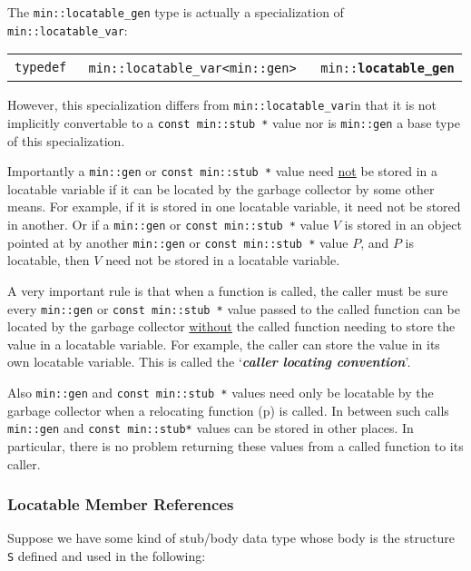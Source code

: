\documentclass[12pt]{article}
\makeatletter
\newcommand{\key}[1]{{\bf \em #1}\index{#1}}
\newcommand{\ttindex}[1]{\index{#1@{\tt #1}}}
\newcommand{\minindex}[1]{\ttindex{min::#1}\ttindex{#1}}
\newcommand{\pagref}[1]{p\pageref{#1}}
\newcommand{\EOL}{\penalty \exhyphenpenalty}
\newenvironment{indpar}[1][0.3in]%
	{\begin{list}{}%
		     {\setlength{\itemsep}{0in}%
		      \setlength{\topsep}{0in}%
		      \setlength{\parsep}{1ex}%
		      \setlength{\labelwidth}{#1}%
		      \setlength{\leftmargin}{#1}%
		      \addtolength{\leftmargin}{\labelsep}}%
	 \item}%
	{\end{list}}
\newcommand{\LABEL}[1]{\label{#1}}
\newcommand{\MINKEY}[1]{{\tt \bf #1}\minindex{#1}}
\makeatother
\begin{document}
The {\tt min::locatable\_gen} type is actually a specialization
of {\tt min::\EOL locatable\_\EOL var}:

\begin{indpar}[0.1in]\begin{tabular}{r@{}l}
\verb|typedef |
	& \verb|min::locatable_var<min::gen>| ~~
	  \verb|min::|\MINKEY{locatable\_gen}
\LABEL{MIN::LOCATABLE_GEN_TYPEDEF} \\
\end{tabular}\end{indpar}

However, this specialization differs from
{\tt min::\EOL locatable\_\EOL var\TARG}in that it is not
implicitly convertable to a {\tt const min::\EOL stub~*} value nor
is {\tt min::gen} a base type of this specialization.

Importantly a \verb|min::gen| or \verb|const min::stub *|
value need \underline{not} be stored
in a locatable variable if it can be located by the garbage collector by some
other means.  For example, if it is stored in one locatable variable,
it need not be stored in another.  Or if a \verb|min::gen|
or {\tt const min::\EOL stub~*} value
$V$ is stored in an object pointed at by another \verb|min::gen|
or {\tt const min::\EOL stub~*}
value $P$, and $P$ is locatable, then $V$ need not
be stored in a locatable variable.

A very important rule is that when a function is called, the caller
must be sure every \verb|min::gen|
or {\tt const min::\EOL stub~*} value passed to the called
function can be located by the garbage collector \underline{without} the called
function needing to store the value in a locatable variable.
For example, the caller can store the value in its own locatable
variable.  This is called the `\key{caller locating convention}'.

Also \verb|min::gen| and {\tt const min::\EOL stub~*}
values need only be locatable by
the garbage collector when a relocating function (\pagref{RELOCATING-FUNCTIONS})
is called.  In between such calls \verb|min::gen|
and {\tt const min::\EOL stub*} values can be
stored in other places.  In particular, there is no problem
returning these values from a called function to its caller.

\subsubsection{Locatable Member References}
\label{LOCATABLE-MEMBER-REFERENCES}

Suppose we have some kind of stub/body data type whose body
is the structure {\tt S} defined and used in the following:
\end{document}
